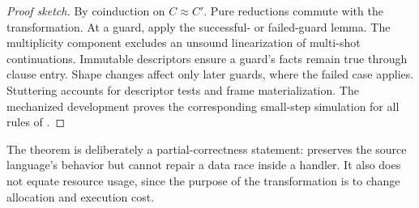 \begin{proof}[Proof sketch]
By coinduction on $C\approx C'$. Pure reductions commute with the
transformation. At a guard, apply the successful- or failed-guard lemma. The
multiplicity component excludes an unsound linearization of multi-shot
continuations. Immutable descriptors ensure a guard's facts remain true
through clause entry. Shape changes affect only later guards, where the failed
case applies. Stuttering accounts for descriptor tests and frame
materialization. The mechanized development proves the corresponding
small-step simulation for all rules of \lang.
\end{proof}

The theorem is deliberately a partial-correctness statement: \system preserves
the source language's behavior but cannot repair a data race inside a handler.
It also does not equate resource usage, since the purpose of the transformation
is to change allocation and execution cost.
